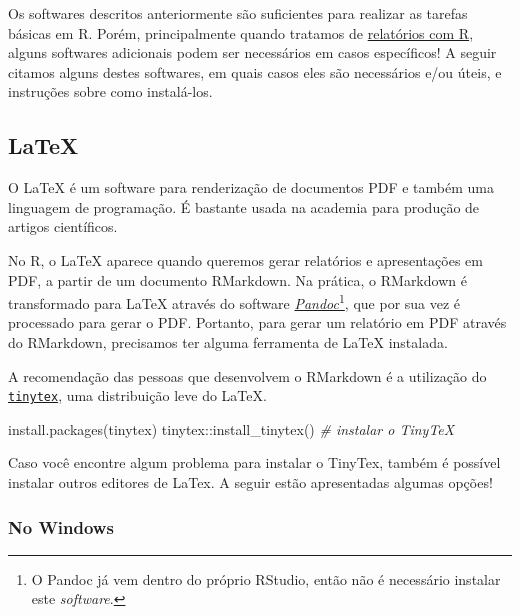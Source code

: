 \documentclass[
]{book}
\newenvironment{Shaded}{\begin{snugshade}}{\end{snugshade}}
\newcommand{\CommentTok}[1]{\textcolor[rgb]{0.56,0.35,0.01}{\textit{#1}}}
\newcommand{\FunctionTok}[1]{\textcolor[rgb]{0.00,0.00,0.00}{#1}}
\newcommand{\NormalTok}[1]{#1}
\newcommand{\SpecialCharTok}[1]{\textcolor[rgb]{0.00,0.00,0.00}{#1}}
\newcommand{\StringTok}[1]{\textcolor[rgb]{0.31,0.60,0.02}{#1}}
\begin{document}
Os softwares descritos anteriormente são suficientes para realizar as tarefas básicas em R. Porém, principalmente quando tratamos de \protect\hyperlink{relatorios}{relatórios com R}, alguns softwares adicionais podem ser necessários em casos específicos! A seguir citamos alguns destes softwares, em quais casos eles são necessários e/ou úteis, e instruções sobre como instalá-los.

\hypertarget{instalacao-latex}{%
\subsection{LaTeX}\label{instalacao-latex}}

O LaTeX é um software para renderização de documentos PDF e também uma linguagem de programação. É bastante usada na academia para produção de artigos científicos.

No R, o LaTeX aparece quando queremos gerar relatórios e apresentações em PDF, a partir de um documento RMarkdown. Na prática, o RMarkdown é transformado para LaTeX através do software \href{https://pandoc.org}{\emph{Pandoc}}\footnote{O Pandoc já vem dentro do próprio RStudio, então não é necessário instalar este \emph{software}.}, que por sua vez é processado para gerar o PDF. Portanto, para gerar um relatório em PDF através do RMarkdown, precisamos ter alguma ferramenta de LaTeX instalada.

A recomendação das pessoas que desenvolvem o RMarkdown é a utilização do \href{https://yihui.org/tinytex/}{\texttt{tinytex}}, uma distribuição leve do LaTeX.

\begin{Shaded}
\begin{Highlighting}[]
\FunctionTok{install.packages}\NormalTok{(}\StringTok{\textquotesingle{}tinytex\textquotesingle{}}\NormalTok{)}
\NormalTok{tinytex}\SpecialCharTok{::}\FunctionTok{install\_tinytex}\NormalTok{()  }\CommentTok{\# instalar o TinyTeX}
\end{Highlighting}
\end{Shaded}

Caso você encontre algum problema para instalar o TinyTex, também é possível instalar outros editores de LaTex. A seguir estão apresentadas algumas opções!

\hypertarget{no-windows-1}{%
\subsubsection{No Windows}\label{no-windows-1}}
\end{document}
